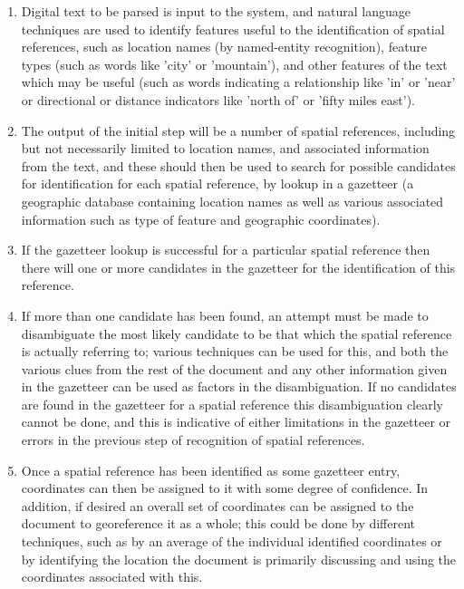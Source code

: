 \documentclass[12pt, a4paper]{report}
\begin{document}
\begin{enumerate}
	\item{Digital text to be parsed is input to the system, and natural language techniques are used to identify features useful to the identification of spatial references, such as location names (by named-entity recognition), feature types (such as words like 'city' or 'mountain'), and other features of the text which may be useful (such as words indicating a relationship like 'in' or 'near' or directional or distance indicators like 'north of' or 'fifty miles east').}
	\item{The output of the initial step will be a number of spatial references, including but not necessarily limited to location names, and associated information from the text, and these should then be used to search for possible candidates for identification for each spatial reference, by lookup in a gazetteer (a geographic database containing location names as well as various associated information such as type of feature and geographic coordinates).}
	\item{If the gazetteer lookup is successful for a particular spatial reference then there will one or more candidates in the gazetteer for the identification of this reference.}
	\item{If more than one candidate has been found, an attempt must be made to disambiguate the most likely candidate to be that which the spatial reference is actually referring to; various techniques can be used for this, and both the various clues from the rest of the document and any other information given in the gazetteer can be used as factors in the disambiguation. If no candidates are found in the gazetteer for a spatial reference this disambiguation clearly cannot be done, and this is indicative of either limitations in the gazetteer or errors in the previous step of recognition of spatial references.}
	\item{Once a spatial reference has been identified as some gazetteer entry, coordinates can then be assigned to it with some degree of confidence. In addition, if desired an overall set of coordinates can be assigned to the document to georeference it as a whole; this could be done by different techniques, such as by an average of the individual identified coordinates or by identifying the location the document is primarily discussing and using the coordinates associated with this.}

\end{enumerate}
\end{document}
